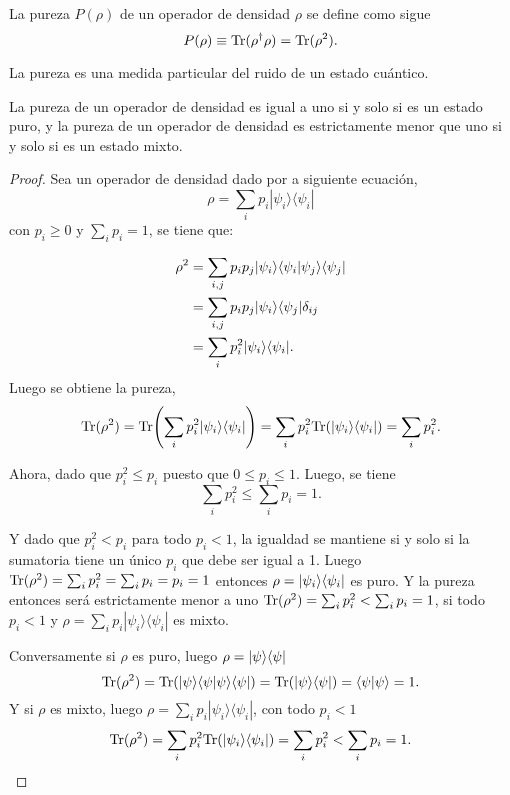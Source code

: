 \begin{definition} La pureza $P(\rho)$ de un operador de densidad $\rho$ se define como sigue {\cite{wilde2011classical}} \begin{equation}
	P(\rho)\equiv{\rm Tr}(\rho^\dagger\rho)={\rm Tr}(\rho^2).
\end{equation}

	\end{definition}

La pureza es una medida particular del ruido de un estado cuántico.

\begin{proposition}
	La pureza de un operador de densidad es igual a uno si y solo si es un estado puro, y la pureza de un operador de densidad es estrictamente menor que uno si y solo si es un estado mixto.
	\end{proposition}


\begin{proof}
	Sea un operador de densidad dado por a siguiente ecuación, \[\rho=\sum_i p_i |\psi_i\rangle \langle \psi_i|\] con $p_i\ge 0$ y $\sum_{i}p_i=1$, se tiene que:
	
	\begin{equation*}
		\begin{split}
			\rho^2&=\sum_{i,j} p_i p_j|\psi_i\rangle \langle \psi_i|\psi_j\rangle \langle \psi_j|\\
			&=\sum_{i,j} p_i p_j|\psi_i \rangle \langle \psi_j|\delta_{ij}\\
			&=\sum_i p_i^2|\psi_i \rangle \langle \psi_i|.
			\end{split}
	\end{equation*}
	Luego se obtiene la pureza, \[{\rm Tr}(\rho^2)={\rm Tr}{\left(\sum_i p_i^2|\psi_i \rangle \langle \psi_i|\right)}=\sum_i p_i^2 {\rm Tr}(|\psi_i \rangle \langle\psi_i|)=\sum_i p_i^2.\]
	
	Ahora, dado que $p_i^2 \le p_i $ puesto que $0 \le p_i \le 1$. Luego, se tiene \[\sum_i p_i^2\le\sum_i p_i=1.\]
	
   Y dado que $p_i^2<p_i$ para todo $p_i<1$, la igualdad se mantiene si y solo si la sumatoria tiene un único $p_i$ que debe ser igual a 1. Luego 	${\rm Tr}(\rho^2)=\sum_{i}p_i^2=\sum_i p_i= p_i=1$ entonces $\rho=|\psi_i\rangle \langle\psi_i|$ es puro. Y la pureza entonces será estrictamente menor a uno  ${\rm Tr}(\rho^2)=\sum_{i}p_i^2<\sum_i p_i=1$, si todo $p_i<1$ y $\rho=\sum_i p_i |\psi_i\rangle \langle \psi_i|$ es mixto.
    
     
	Conversamente si $\rho $ es puro, luego $\rho=|\psi\rangle \langle \psi|$ \[{\rm Tr}(\rho^2)={\rm Tr}(|\psi\rangle \langle \psi|\psi\rangle \langle \psi|)={\rm Tr}(|\psi\rangle \langle \psi|)=\langle\psi|\psi\rangle=1.\]	
	Y si $\rho $ es mixto, luego $\rho=\sum_i p_i|\psi_i\rangle \langle \psi_i|$, con todo $p_i<1$ \[{\rm Tr}(\rho^2)=\sum_i p_i^2 {\rm Tr}(|\psi_i \rangle \langle\psi_i|)=\sum_i p_i^2<\sum_i p_i=1.\]
	\end{proof}



